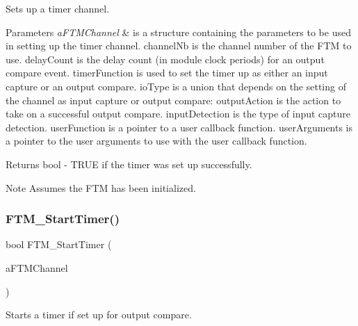 Sets up a timer channel. 


\begin{DoxyParams}{Parameters}
{\em a\+F\+T\+M\+Channel} & is a structure containing the parameters to be used in setting up the timer channel. channel\+Nb is the channel number of the F\+TM to use. delay\+Count is the delay count (in module clock periods) for an output compare event. timer\+Function is used to set the timer up as either an input capture or an output compare. io\+Type is a union that depends on the setting of the channel as input capture or output compare\+: output\+Action is the action to take on a successful output compare. input\+Detection is the type of input capture detection. user\+Function is a pointer to a user callback function. user\+Arguments is a pointer to the user arguments to use with the user callback function. \\
\hline
\end{DoxyParams}
\begin{DoxyReturn}{Returns}
bool -\/ T\+R\+UE if the timer was set up successfully. 
\end{DoxyReturn}
\begin{DoxyNote}{Note}
Assumes the F\+TM has been initialized. 
\end{DoxyNote}
\mbox{\label{group__main__module_gabb34a0dd79d879502fd81c0efa9440ec}} 
\subsubsection{\texorpdfstring{F\+T\+M\+\_\+\+Start\+Timer()}{FTM\_StartTimer()}}
{\footnotesize\ttfamily bool F\+T\+M\+\_\+\+Start\+Timer (\begin{DoxyParamCaption}\item[{const \hyperlink{struct_t_f_t_m_channel}{T\+F\+T\+M\+Channel} $\ast$const}]{a\+F\+T\+M\+Channel }\end{DoxyParamCaption})}



Starts a timer if set up for output compare. 


